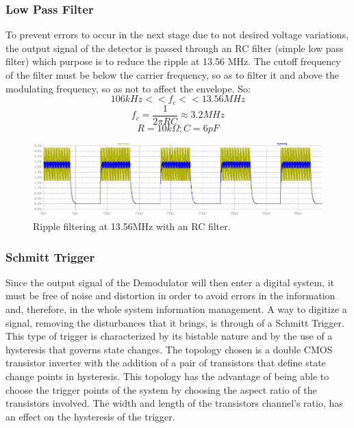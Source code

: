 \documentclass[a4paper, 10pt, conference]{ieeeconf}      %
\begin{document}
\subsubsection{Low Pass Filter}
To prevent errors to occur in the next stage due to not desired voltage variations, the output signal of the detector is passed through an RC filter (simple low pass filter) which purpose is to reduce the ripple at 13.56 MHz. The cutoff frequency of the filter must be below the carrier frequency, so as to filter it and above the modulating frequency, so as not to affect the envelope. So:
$$106kHz<<f_c<<13.56MHz$$
$$f_c = \frac{1}{2\pi RC} \approx 3.2MHz$$
$$R = 10 k\Omega ; C = 6 pF$$

\begin{figure}[H]
\centering
\includegraphics[scale=0.2]{Images/ImagenesTesina/Antecedentes/Sim_RC.png}
\caption{Ripple filtering at 13.56MHz with an RC filter.}
\label{fig:Sim_RC}
\end{figure}

\subsubsection{Schmitt Trigger}
Since the output signal of the Demodulator will then enter a digital system, it must be free of noise and distortion in order to avoid errors in the information and, therefore, in the whole system information management. A way to digitize a signal, removing the disturbances that it brings, is through of a Schmitt Trigger. This type of trigger is characterized by its bistable nature and by the use of a hysteresis that governs state changes. The topology chosen is a double CMOS transistor inverter with the addition of a pair of transistors that define state change points in hysteresis. This topology has the advantage of being able to choose the trigger points of the system by choosing the aspect ratio of the transistors involved. The width and length of the transistors channel’s ratio, has an effect on the hysteresis of the trigger.
\end{document}
